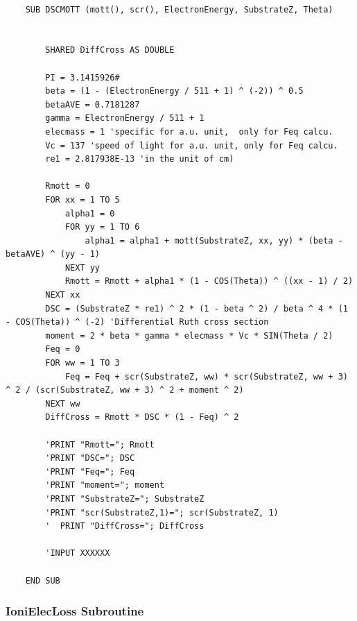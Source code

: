 \documentclass[10pt, reqno]{exam}
\begin{document}
\begin{verbatim}
    
    SUB DSCMOTT (mott(), scr(), ElectronEnergy, SubstrateZ, Theta)
    
    
        SHARED DiffCross AS DOUBLE
    
        PI = 3.1415926#
        beta = (1 - (ElectronEnergy / 511 + 1) ^ (-2)) ^ 0.5
        betaAVE = 0.7181287
        gamma = ElectronEnergy / 511 + 1
        elecmass = 1 'specific for a.u. unit,  only for Feq calcu.
        Vc = 137 'speed of light for a.u. unit, only for Feq calcu.
        re1 = 2.817938E-13 'in the unit of cm)
    
        Rmott = 0
        FOR xx = 1 TO 5
            alpha1 = 0
            FOR yy = 1 TO 6
                alpha1 = alpha1 + mott(SubstrateZ, xx, yy) * (beta - betaAVE) ^ (yy - 1)
            NEXT yy
            Rmott = Rmott + alpha1 * (1 - COS(Theta)) ^ ((xx - 1) / 2)
        NEXT xx
        DSC = (SubstrateZ * re1) ^ 2 * (1 - beta ^ 2) / beta ^ 4 * (1 - COS(Theta)) ^ (-2) 'Differential Ruth cross section
        moment = 2 * beta * gamma * elecmass * Vc * SIN(Theta / 2)
        Feq = 0
        FOR ww = 1 TO 3
            Feq = Feq + scr(SubstrateZ, ww) * scr(SubstrateZ, ww + 3) ^ 2 / (scr(SubstrateZ, ww + 3) ^ 2 + moment ^ 2)
        NEXT ww
        DiffCross = Rmott * DSC * (1 - Feq) ^ 2
    
        'PRINT "Rmott="; Rmott
        'PRINT "DSC="; DSC
        'PRINT "Feq="; Feq
        'PRINT "moment="; moment
        'PRINT "SubstrateZ="; SubstrateZ
        'PRINT "scr(SubstrateZ,1)="; scr(SubstrateZ, 1)
        '  PRINT "DiffCross="; DiffCross
    
        'INPUT XXXXXX
    
    END SUB
\end{verbatim}

\subsubsection{IoniElecLoss Subroutine}
\end{document}

